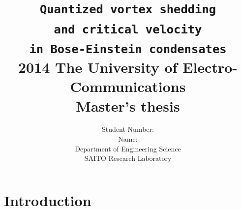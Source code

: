 \documentclass[12pt,a4paper]{report}
\title{
{\Huge \tt Quantized vortex shedding
\\ and critical velocity
\\in Bose-Einstein condensates} \\[1cm]
{\Large 2014 The University of Electro-Communications \\
Master's thesis} \\[1cm]
}
\author{
\LARGE Student Number: \fbox{1133026} \\[0.5cm]
\LARGE Name: \fbox{Tsuyoshi Kadokura } \\[0.5cm]
\LARGE Department of Engineering Science \\[0.5cm]
\LARGE SAITO Research Laboratory \\[0.5cm]
\date{}
}
\begin{document}
\maketitle
\makeatletter
\def\ps@fancy{%
\def\chaptermark##1{\markboth{\ifnum \c@secnumdepth>\z@ \thechapter\hskip 0.5em\relax \fi ##1}{}}%
\def\sectionmark##1{\markright {\ifnum \c@secnumdepth >\@ne \thesection\hskip 0.5em\relax \fi ##1}}%
\ps@@fancy
\gdef\ps@fancy{\@fancyplainfalse\ps@@fancy}%
\ifdim\headwidth<0sp
\global\advance\headwidth123456789sp\global\advance\headwidth\textwidth
\fi
}
\makeatother
\pagestyle{fancy}
\tableofcontents
\setcounter{page}{1}
\lhead{\thepage}
\cfoot{\thepage}
\chapter{Introduction}
\end{document}
